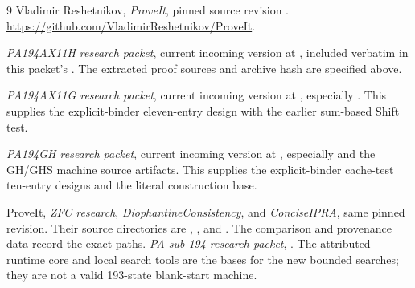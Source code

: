 \begin{thebibliography}{9}
Vladimir Reshetnikov, \emph{ProveIt}, pinned source revision
.
\url{https://github.com/VladimirReshetnikov/ProveIt}.

\emph{PA194AX11H research packet}, current incoming version at
,
included verbatim in this packet's .
The extracted proof sources and archive hash are specified above.

\emph{PA194AX11G research packet}, current incoming version at
,
especially . This supplies the explicit-binder
eleven-entry design with the earlier sum-based Shift test.

\emph{PA194GH research packet}, current incoming version at
,
especially  and the GH/GHS
machine source artifacts. This supplies the explicit-binder
cache-test ten-entry designs and the literal construction base.

ProveIt, \emph{ZFC research}, \emph{DiophantineConsistency}, and
\emph{ConciseIPRA}, same pinned revision. Their source directories are
,
, and
.
The comparison and provenance data record the exact paths.
\emph{PA sub-194 research packet},
.
The attributed runtime core and local search tools are the bases for the
new bounded searches; they are not a valid 193-state blank-start machine.
\end{thebibliography}
